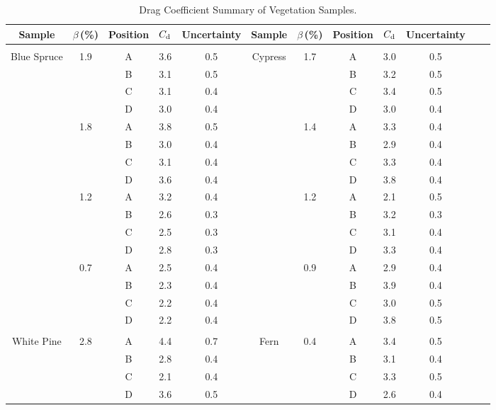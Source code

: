\documentclass[12pt]{article}
\begin{document}
\begin{table}[!]

\caption{Drag Coefficient Summary of Vegetation Samples.}
\label{tab:SumTable}
\centering
	\footnotesize
	\begin{tabular}{cccccccccccc}	
			\hline
\textbf{Sample}		& \textbf{$\beta$\,(\%)}		&\textbf{Position}& $C_{\rm d}$ &\textbf{Uncertainty}	&\textbf{Sample}		& \textbf{$\beta$\,(\%)}&\textbf{Position}& 	\textbf{$C_{\rm d}$ }&\textbf{Uncertainty}\\
\hline
\\[0.05cm]
Blue Spruce			&	1.9	&	A	& 	3.6		&	0.5			& Cypress       		&	1.7	&	A	& 	3.0	&	0.5	\\
				&		&	B	& 	3.1		&	0.5			&				&		&	B	& 	3.2	&	0.5	\\
				&		&	C	& 	3.1		&	0.4			&				&		&	C	& 	3.4	&	0.5	\\
				&		&	D	& 	3.0		&	0.4			&				&		&	D	& 	3.0	&	0.4	\\
				&	1.8	&	A	& 	3.8		&	0.5			&				&	1.4	&	A	& 	3.3	&	0.4	\\
				&		&	B	& 	3.0		&	0.4			&				&		&	B	& 	2.9	&	0.4	\\
				&		&	C	& 	3.1		&	0.4			&				&		&	C	& 	3.3	&	0.4	\\
				&		&	D	& 	3.6		&	0.4			&				&		&	D	& 	3.8	&	0.4	\\
				&	1.2	&	A	& 	3.2		&	0.4			&				&	1.2	&	A	& 	2.1	&	0.5	\\
				&		&	B	& 	2.6		&	0.3			&				&		&	B	& 	3.2	&	0.3	\\
				&		&	C	& 	2.5		&	0.3			&				&		&	C	& 	3.1	&	0.4	\\
				&		&	D	& 	2.8		&	0.3			&				&		&	D	& 	3.3	&	0.4	\\
				&	0.7	&	A	& 	2.5		&	0.4			&				&	0.9	&	A	& 	2.9	&	0.4	\\
				&		&	B	& 	2.3		&	0.4			&				&		&	B	& 	3.9	&	0.4	\\
				&		&	C	& 	2.2		&	0.4			&				&		&	C	& 	3.0	&	0.5	\\
				&		&	D	& 	2.2		&	0.4			&				&		&	D	& 	3.8	&	0.5	\\
				&		&		& 			&				&				&		&		& 		&		\\
White Pine	       		&	2.8	&	A	& 	4.4		&	0.7			& Fern	       		&	0.4	&	A	& 	3.4	&	0.5	\\
				&		&	B	& 	2.8		&	0.4			&				&		&	B	& 	3.1	&	0.4	\\	
				&		&	C	& 	2.1		&	0.4			&				&		&	C	& 	3.3	&	0.5	\\
				&		&	D	& 	3.6		&	0.5			&				&		&	D	& 	2.6	&	0.4	\\

\end{tabular}
\end{table}
\end{document}
